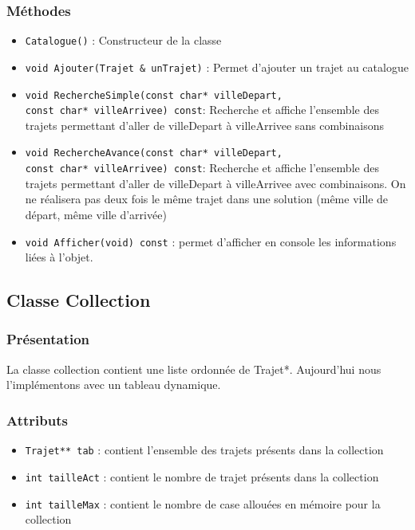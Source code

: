 \documentclass[10pt,a4paper,twoside]{article}
\begin{document}
\subsubsection{Méthodes}
\begin{itemize}
\item \verb$Catalogue()$ : Constructeur de la classe
\item \verb=void Ajouter(Trajet & unTrajet)= : Permet d'ajouter un trajet au catalogue
\item \verb=void RechercheSimple(const char* villeDepart,=  \\
\verb=const char* villeArrivee) const=: Recherche et affiche l'ensemble des trajets permettant d'aller de villeDepart à villeArrivee sans combinaisons
\item \verb=void RechercheAvance(const char* villeDepart,= \\
\verb=const char* villeArrivee) const=: Recherche et affiche l'ensemble des trajets permettant d'aller de villeDepart à villeArrivee avec combinaisons. On ne réalisera pas deux fois le même trajet dans une solution (même ville de départ, même ville d'arrivée)
\item \verb=void Afficher(void) const= : permet d'afficher en console les informations liées à l'objet. 
\end{itemize}

\subsection{Classe Collection}
\subsubsection{Présentation}
La classe collection contient une liste ordonnée de Trajet*. Aujourd'hui nous l'implémentons avec un tableau dynamique.

\subsubsection{Attributs}
\begin{itemize}
\item \verb=Trajet** tab= : contient l'ensemble des trajets présents dans la collection
\item \verb=int tailleAct= : contient le nombre de trajet présents dans la collection
\item \verb=int tailleMax= : contient le nombre de case allouées en mémoire pour la collection
\end{itemize}
\end{document}
